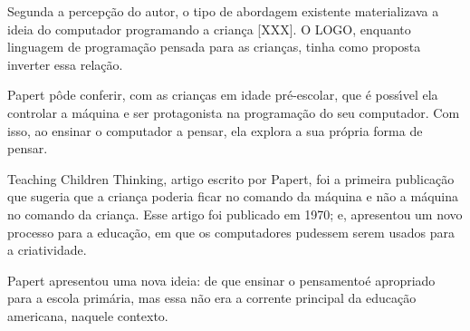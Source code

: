 \documentclass[
12pt,		%
openright,	%
twoside,  %
a4paper,			%
chapter=TITLE,		%
english,			%
french,				%
spanish,			%
brazil				%
]{USPSC-classe/USPSC}
\begin{document}
Segunda a percep\c{c}\~ao do autor, o tipo de abordagem existente materializava a ideia do computador programando a crian\c{c}a [XXX]. O LOGO, enquanto linguagem de programa\c{c}\~ao pensada para as crian\c{c}as, tinha como proposta inverter essa rela\c{c}\~ao.

















Papert p\^ode conferir, com as crian\c{c}as em idade pr\'e-escolar, que \'e poss\'{\i}vel ela controlar a m\'aquina e ser protagonista na programa\c{c}\~ao do seu computador. Com isso, ao ensinar o computador a pensar, ela explora a sua pr\'opria forma de pensar.

















Teaching Children Thinking, artigo escrito por Papert, foi a primeira publica\c{c}\~ao que sugeria que a crian\c{c}a poderia ficar no comando da m\'aquina e n\~ao a m\'aquina no comando da crian\c{c}a.  Esse artigo  foi publicado em 1970; e,  apresentou um novo processo para a educa\c{c}\~ao, em que os computadores pudessem serem usados para a criatividade.

















Papert apresentou uma nova ideia: de que \textquotedbl ensinar o pensamento\textquotedbl   \'e apropriado para a escola prim\'aria, mas essa n\~ao era a corrente principal da educa\c{c}\~ao americana, naquele contexto.
\end{document}
